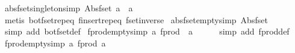 \begin{isabellebody}
\endisatagproof
{\isafoldproof}%
%
\isadelimproof
\isanewline
%
\endisadelimproof
\isanewline
{}\isamarkupfalse%
\ abs{\isacharunderscore}fset{\isacharunderscore}singleton{\isacharbrackleft}simp{\isacharbrackright}{\isacharcolon}\ {\isachardoublequoteopen}Abs{\isacharunderscore}fset\ {\isacharbraceleft}a{\isacharbraceright}\ {\isacharequal}\ {\isacharbraceleft}{\isacharbar}a{\isacharbar}{\isacharbraceright}{\isachardoublequoteclose}\isanewline
%
\isadelimproof
\ \ %
\endisadelimproof
%
\isatagproof
{}\isamarkupfalse%
\ {\isacharparenleft}metis\ bot{\isacharunderscore}fset{\isachardot}rep{\isacharunderscore}eq\ finsert{\isachardot}rep{\isacharunderscore}eq\ fset{\isacharunderscore}inverse{\isacharparenright}%
\endisatagproof
{\isafoldproof}%
%
\isadelimproof
\isanewline
%
\endisadelimproof
\isanewline
{}\isamarkupfalse%
\ abs{\isacharunderscore}fset{\isacharunderscore}empty{\isacharbrackleft}simp{\isacharbrackright}{\isacharcolon}\ {\isachardoublequoteopen}Abs{\isacharunderscore}fset\ {\isacharbraceleft}{\isacharbraceright}\ {\isacharequal}\ {\isacharbraceleft}{\isacharbar}{\isacharbar}{\isacharbraceright}{\isachardoublequoteclose}\isanewline
%
\isadelimproof
\ \ %
\endisadelimproof
%
\isatagproof
{}\isamarkupfalse%
\ {\isacharparenleft}simp\ add{\isacharcolon}\ bot{\isacharunderscore}fset{\isacharunderscore}def{\isacharparenright}%
\endisatagproof
{\isafoldproof}%
%
\isadelimproof
\isanewline
%
\endisadelimproof
\isanewline
{}\isamarkupfalse%
\ fprod{\isacharunderscore}empty{\isacharbrackleft}simp{\isacharbrackright}{\isacharcolon}\ {\isachardoublequoteopen}{\isasymforall}a{\isachardot}\ fprod\ {\isacharbraceleft}{\isacharbar}{\isacharbar}{\isacharbraceright}\ a\ {\isacharequal}\ {\isacharbraceleft}{\isacharbar}{\isacharbar}{\isacharbraceright}{\isachardoublequoteclose}\isanewline
%
\isadelimproof
\ \ %
\endisadelimproof
%
\isatagproof
{}\isamarkupfalse%
\ {\isacharparenleft}simp\ add{\isacharcolon}\ fprod{\isacharunderscore}def{\isacharparenright}%
\endisatagproof
{\isafoldproof}%
%
\isadelimproof
\isanewline
%
\endisadelimproof
\isanewline
{}\isamarkupfalse%
\ fprod{\isacharunderscore}empty{\isacharunderscore}{}{\isacharbrackleft}simp{\isacharbrackright}{\isacharcolon}\ {\isachardoublequoteopen}{\isasymforall}a{\isachardot}\ fprod\ a\ {\isacharbraceleft}{\isacharbar}{\isacharbar}{\isacharbraceright}\ {\isacharequal}\ {\isacharbraceleft}{\isacharbar}{\isacharbar}{\isacharbraceright}{\isachardoublequoteclose}\isanewline
%
\isadelimproof
\ \ %

\end{isabellebody}
